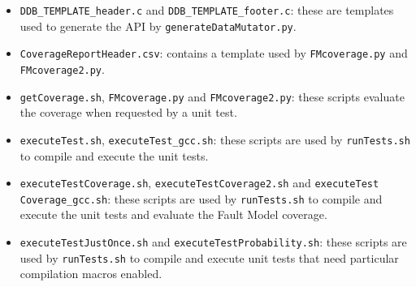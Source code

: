 \begin{itemize}
{\begin{itemize}
\begin{itemize}
\begin{itemize}
			\item \texttt{DDB\_TEMPLATE\_header.c} and \texttt{DDB\_TEMPLATE\_footer.c}: these are templates used to generate the \DAMA API by \texttt{generateDataMutator.py}.
			\item \texttt{CoverageReportHeader.csv}: contains a template used by \texttt{FMcoverage.py} and \texttt{FMcoverage2.py}.
			\item \texttt{getCoverage.sh}, \texttt{FMcoverage.py} and \texttt{FMcoverage2.py}: these scripts evaluate the coverage when requested by a unit test.
			\item \texttt{executeTest.sh}, \texttt{executeTest\_gcc.sh}: these scripts are used by \texttt{runTests.sh} to compile and execute the unit tests.
			\item \texttt{executeTestCoverage.sh}, \texttt{executeTestCoverage2.sh} and  \texttt{execute}\texttt{Test}
			\texttt{Coverage}\texttt{\_gcc.sh}: these scripts are used by \texttt{runTests.sh} to compile and execute the unit tests and evaluate the Fault Model coverage.
			\item \texttt{executeTestJustOnce.sh} and \texttt{executeTestProbability.sh}: these scripts are used by \texttt{runTests.sh} to compile and execute unit tests that need particular compilation macros enabled.
		\end{itemize}%
	\end{itemize}%
\end{itemize}%
}



\end{itemize}

